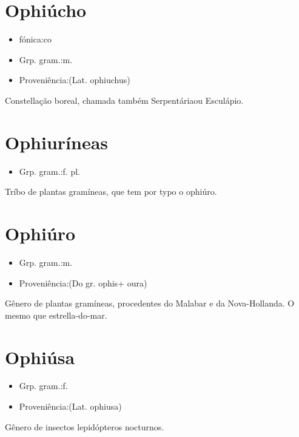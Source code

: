 \section{Ophiúcho}
\begin{itemize}
\item {fónica:co}
\end{itemize}
\begin{itemize}
\item {Grp. gram.:m.}
\end{itemize}
\begin{itemize}
\item {Proveniência:(Lat. \textunderscore ophiuchus\textunderscore )}
\end{itemize}
Constellação boreal, chamada também \textunderscore Serpentária\textunderscore  ou \textunderscore Esculápio\textunderscore .
\section{Ophiuríneas}
\begin{itemize}
\item {Grp. gram.:f. pl.}
\end{itemize}
Tríbo de plantas gramíneas, que tem por typo o ophiúro.
\section{Ophiúro}
\begin{itemize}
\item {Grp. gram.:m.}
\end{itemize}
\begin{itemize}
\item {Proveniência:(Do gr. \textunderscore ophis\textunderscore  + \textunderscore oura\textunderscore )}
\end{itemize}
Gênero de plantas gramíneas, procedentes do Malabar e da Nova-Hollanda.
O mesmo que \textunderscore estrella-do-mar\textunderscore .
\section{Ophiúsa}
\begin{itemize}
\item {Grp. gram.:f.}
\end{itemize}
\begin{itemize}
\item {Proveniência:(Lat. \textunderscore ophiusa\textunderscore )}
\end{itemize}
Gênero de insectos lepidópteros nocturnos.

